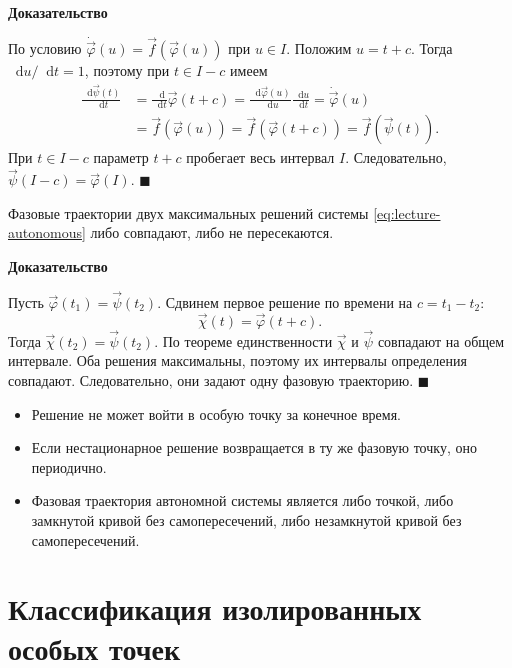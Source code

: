 \documentclass[12pt,a4paper]{article}
\numberwithin{equation}{section}
\newcommand{\vect}[1]{\vec{#1}}
\newcommand{\dd}{\mathop{}\!\mathrm{d}}
\renewenvironment{proof}[1][Доказательство]{\begin{center}\textbf{#1}\end{center}}{\hfill$\blacksquare$\par}
\begin{document}
\begin{proof}
По условию $\dot{\vect\varphi}(u)=\vect f(\vect\varphi(u))$ при $u\in I$.
Положим $u=t+c$. Тогда $\dd u/\dd t=1$, поэтому при $t\in I-c$ имеем
\[
 \begin{aligned}
 \frac{\dd\vect\psi(t)}{\dd t}
 &=\frac{\dd}{\dd t}\vect\varphi(t+c)
 =\frac{\dd\vect\varphi(u)}{\dd u}\frac{\dd u}{\dd t}
 =\dot{\vect\varphi}(u)\\
 &=\vect f(\vect\varphi(u))=\vect f(\vect\varphi(t+c))
 =\vect f(\vect\psi(t)).
 \end{aligned}
\]
При $t\in I-c$ параметр $t+c$ пробегает весь интервал $I$.
Следовательно, $\vect\psi(I-c)=\vect\varphi(I)$.
\end{proof}


\begin{theoremHSE}
Фазовые траектории двух максимальных решений системы \eqref{eq:lecture-autonomous} либо совпадают, либо не пересекаются.
\end{theoremHSE}

\begin{proof}
Пусть $\vect{\varphi}(t_1)=\vect{\psi}(t_2)$. Сдвинем первое решение по времени на $c=t_1-t_2$:
\[
\vect{\chi}(t)=\vect{\varphi}(t+c).
\]
Тогда $\vect{\chi}(t_2)=\vect{\psi}(t_2)$. По теореме единственности $\vect{\chi}$ и $\vect{\psi}$ совпадают на общем интервале. Оба решения максимальны, поэтому их интервалы определения совпадают. Следовательно, они задают одну фазовую траекторию.
\end{proof}

\begin{corollaryHSE}[Следствия]
\begin{itemize}
  \item Решение не может войти в особую точку за конечное время.
  \item Если нестационарное решение возвращается в ту же фазовую точку, оно периодично.
  \item Фазовая траектория автономной системы является либо точкой, либо замкнутой кривой без самопересечений, либо незамкнутой кривой без самопересечений.
\end{itemize}
\end{corollaryHSE}

\section[Классификация особых точек]{Классификация изолированных особых точек}
\end{document}
